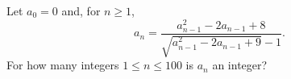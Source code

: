 Let $a_0=0$ and, for $n\ge1$,
\[
a_n=\dfrac{a_{n-1}^2-2a_{n-1}+8}{\sqrt{a_{n-1}^2-2a_{n-1}+9}-1}.
\]
For how many integers $1\le n\le100$ is $a_n$ an integer?

